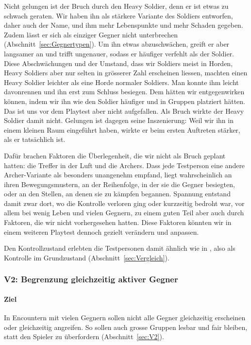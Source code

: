 \documentclass[../Main.tex]{subfiles}
\begin{document}
Nicht gelungen ist der Bruch durch den Heavy Soldier, denn er ist etwas zu schwach geraten. Wir haben ihn als stärkere Variante des Soldiers entworfen, daher auch der Name, und ihm mehr Lebenspunkte und mehr Schaden gegeben. Zudem lässt er sich als einziger Gegner nicht unterbrechen (Abschnitt~\ref{sec:Gegnertypen}). Um ihn etwas abzuschwächen, greift er aber langsamer an und trifft ungenauer, sodass er häufiger verfehlt als der Soldier. Diese Abschwächungen und der Umstand, dass wir Soldiers meist in Horden, Heavy Soldiers aber nur selten in grösserer Zahl erscheinen liessen, machten einen Heavy Soldier leichter als eine Horde normaler Soldiers. Man konnte ihm leicht davonrennen und ihn erst zum Schluss besiegen. Dem hätten wir entgegenwirken können, indem wir ihn wie den Soldier häufiger und in Gruppen platziert hätten. Das ist uns vor dem Playtest aber nicht aufgefallen. Als Bruch wirkte der Heavy Soldier damit nicht. Gelungen ist dagegen seine Inszenierung: Weil wir ihn in einem kleinen Raum eingeführt haben, wirkte er beim ersten Auftreten stärker, als er tatsächlich ist.

Dafür brachen Faktoren die Überlegenheit, die wir nicht als Bruch geplant hatten: die Treffer in der Luft und die Archers. Dass jede Testperson eine andere Archer-Variante als besonders unangenehm empfand, liegt wahrscheinlich an ihren Bewegungsmustern, an der Reihenfolge, in der sie die Gegner besiegten, oder an den Stellen, an denen sie zu kämpfen begannen. Spannung entstand damit zwar dort, wo die Kontrolle verloren ging oder kurzzeitig bedroht war, vor allem bei wenig Leben und vielen Gegnern, zu einem guten Teil aber auch durch Faktoren, die wir nicht vorhergesehen hatten. Diese Faktoren könnten wir in einem weiteren Playtest dennoch gezielt verändern und anpassen.

Den Kontrollzustand erlebten die Testpersonen damit ähnlich wie in , also als Kontrolle im Grundzustand (Abschnitt~\ref{sec:Vergleich}).

\subsubsection{V2: Begrenzung gleichzeitig aktiver Gegner}

\paragraph{Ziel}
In Encountern mit vielen Gegnern sollen nicht alle Gegner gleichzeitig erscheinen oder gleichzeitig angreifen. So sollen auch grosse Gruppen lesbar und fair bleiben, statt den Spieler zu überfordern (Abschnitt~\ref{sec:V2}).
\end{document}
